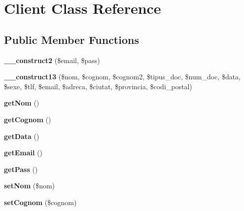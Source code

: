 \hypertarget{classClient}{}\section{Client Class Reference}
\label{classClient}
\subsection*{Public Member Functions}
\begin{DoxyCompactItemize}
\item 
{\bfseries \+\_\+\+\_\+construct2} (\$email, \$pass)\hypertarget{classClient_a6e9577a27aab633ab35dade7a6e6b46a}{}\label{classClient_a6e9577a27aab633ab35dade7a6e6b46a}

\item 
{\bfseries \+\_\+\+\_\+construct13} (\$nom, \$cognom, \$cognom2, \$tipus\+\_\+doc, \$num\+\_\+doc, \$data, \$sexe, \$tlf, \$email, \$adreca, \$ciutat, \$provincia, \$codi\+\_\+postal)\hypertarget{classClient_aca0829a82cab750269f59a97d570b42e}{}\label{classClient_aca0829a82cab750269f59a97d570b42e}

\item 
{\bfseries get\+Nom} ()\hypertarget{classClient_aab5aa4d97d85793256bfb45f202d1d70}{}\label{classClient_aab5aa4d97d85793256bfb45f202d1d70}

\item 
{\bfseries get\+Cognom} ()\hypertarget{classClient_a77fd39c977211b89b5fbf858700de103}{}\label{classClient_a77fd39c977211b89b5fbf858700de103}

\item 
{\bfseries get\+Data} ()\hypertarget{classClient_a33609cd65e175ef4da91e676e107ffaf}{}\label{classClient_a33609cd65e175ef4da91e676e107ffaf}

\item 
{\bfseries get\+Email} ()\hypertarget{classClient_aea7b16bb2bf50de1a945aa12e234e926}{}\label{classClient_aea7b16bb2bf50de1a945aa12e234e926}

\item 
{\bfseries get\+Pass} ()\hypertarget{classClient_a6ba73c123e9e2225a370bb05c287e4c6}{}\label{classClient_a6ba73c123e9e2225a370bb05c287e4c6}

\item 
{\bfseries set\+Nom} (\$nom)\hypertarget{classClient_ad1f7f80377ba9d520c755e3ad839e5e3}{}\label{classClient_ad1f7f80377ba9d520c755e3ad839e5e3}

\item 
{\bfseries set\+Cognom} (\$cognom)\hypertarget{classClient_a4c2d57e38a185ca3c3c63b7279ab2596}{}\label{classClient_a4c2d57e38a185ca3c3c63b7279ab2596}


\end{DoxyCompactItemize}
